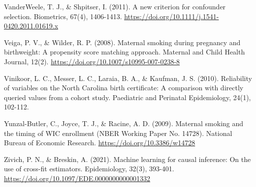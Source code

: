 \documentclass[11pt,letterpaper]{article}
\begin{document}
{VanderWeele, T. J., \& Shpitser, I. (2011). A new criterion for confounder selection. Biometrics, 67(4), 1406-1413. \url{https://doi.org/10.1111/j.1541-0420.2011.01619.x}

Veiga, P. V., \& Wilder, R. P. (2008). Maternal smoking during pregnancy and birthweight: A propensity score matching approach. Maternal and Child Health Journal, 12(2). \url{https://doi.org/10.1007/s10995-007-0238-8}

Vinikoor, L. C., Messer, L. C., Laraia, B. A., \& Kaufman, J. S. (2010). Reliability of variables on the North Carolina birth certificate: A comparison with directly queried values from a cohort study. Paediatric and Perinatal Epidemiology, 24(1), 102-112.

Yunzal-Butler, C., Joyce, T. J., \& Racine, A. D. (2009). Maternal smoking and the timing of WIC enrollment (NBER Working Paper No. 14728). National Bureau of Economic Research. \url{https://doi.org/10.3386/w14728}

Zivich, P. N., \& Breskin, A. (2021). Machine learning for causal inference: On the use of cross-fit estimators. Epidemiology, 32(3), 393-401. \url{https://doi.org/10.1097/EDE.0000000000001332}

}
\end{document}
